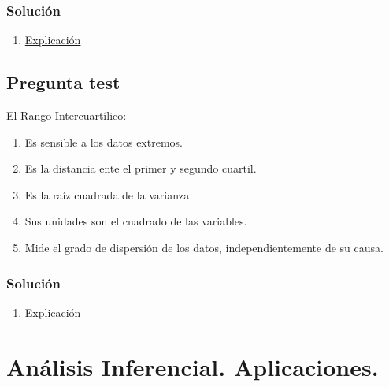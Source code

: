 \documentclass[
]{book}
\providecommand{\tightlist}{%
  \setlength{\itemsep}{0pt}\setlength{\parskip}{0pt}}
\begin{document}
\hypertarget{soluciuxf3n-59}{%
\subsection{Solución}\label{soluciuxf3n-59}}

\begin{enumerate}
\def\labelenumi{\alph{enumi})}
\setcounter{enumi}{4}
\tightlist
\item
  \href{https://1fjmanzano.github.io/bioestadistica/medidas-de-forma.html}{Explicación}
\end{enumerate}

\hypertarget{pregunta-test-58}{%
\section{Pregunta test}\label{pregunta-test-58}}

El Rango Intercuartílico:

\begin{enumerate}
\def\labelenumi{\alph{enumi})}
\tightlist
\item
  Es sensible a los datos extremos.
\item
  Es la distancia ente el primer y segundo cuartil.
\item
  Es la raíz cuadrada de la varianza
\item
  Sus unidades son el cuadrado de las variables.
\item
  Mide el grado de dispersión de los datos, independientemente de su causa.
\end{enumerate}

\hypertarget{soluciuxf3n-60}{%
\subsection{Solución}\label{soluciuxf3n-60}}

\begin{enumerate}
\def\labelenumi{\alph{enumi})}
\setcounter{enumi}{4}
\tightlist
\item
  \href{https://1fjmanzano.github.io/bioestadistica/medidas-de-posicio\%CC\%81n-dispersio\%CC\%81n-y-forma.html\#medidas-de-dispersio\%CC\%81n}{Explicación}
\end{enumerate}

\hypertarget{anuxe1lisis-inferencial.-aplicaciones.}{%
\chapter{Análisis Inferencial. Aplicaciones.}\label{anuxe1lisis-inferencial.-aplicaciones.}}
\end{document}
